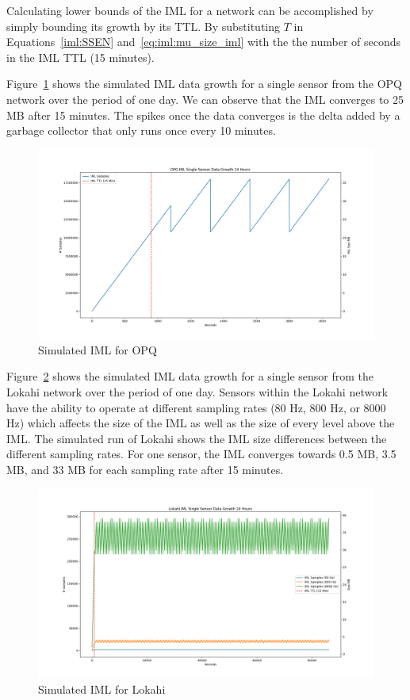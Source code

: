 Calculating lower bounds of the IML for a network can be accomplished by simply bounding its growth by its TTL\@. By substituting $T$ in Equations~\ref{iml:SSEN} and~\ref{eq:iml:mu_size_iml} with the the number of seconds in the IML TTL (15 minutes).

Figure~\ref{fig:sim_iml_opq} shows the simulated IML data growth for a single sensor from the OPQ network over the period of one day. We can observe that the IML converges to 25 MB after 15 minutes. The spikes once the data converges is the delta added by a garbage collector that only runs once every 10 minutes.

\begin{figure}[H]
	\centering
	\includegraphics[width=\linewidth]{figures/sim_iml_opq.png}
	\caption{Simulated IML for OPQ}
	\label{fig:sim_iml_opq}
\end{figure}

Figure~\ref{fig:sim_iml_lokahi} shows the simulated IML data growth for a single sensor from the Lokahi network over the period of one day. Sensors within the Lokahi network have the ability to operate at different sampling rates (80 Hz, 800 Hz, or 8000 Hz) which affects the size of the IML as well as the size of every level above the IML. The simulated run of Lokahi shows the IML size differences between the different sampling rates. For one sensor, the IML converges towards 0.5 MB, 3.5 MB, and 33 MB for each sampling rate after 15 minutes.

\begin{figure}[H]
	\centering
	\includegraphics[width=\linewidth]{figures/sim_iml_lokahi.png}
	\caption{Simulated IML for Lokahi}
	\label{fig:sim_iml_lokahi}
\end{figure}

